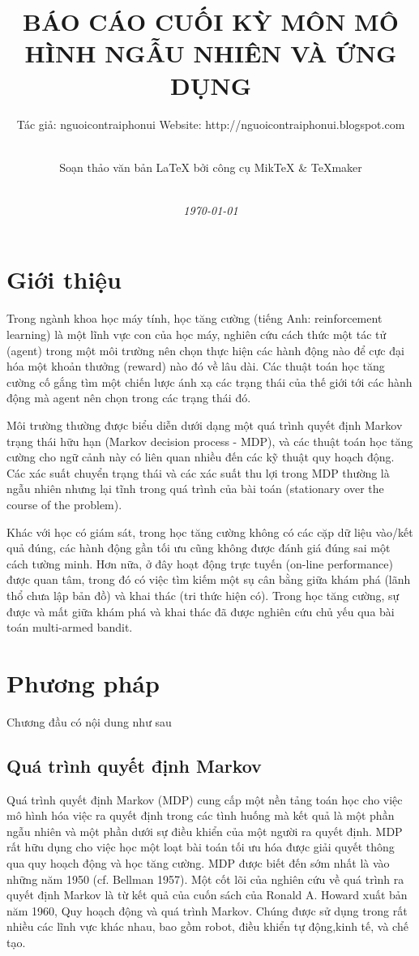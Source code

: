 \documentclass[14pt,a4paper,oneside]{report}		%
\title{{\bf  BÁO CÁO CUỐI KỲ MÔN MÔ HÌNH NGẪU NHIÊN VÀ ỨNG DỤNG}}
\author{Tác giả: nguoicontraiphonui \hspace*{1cm}Website: http://nguoicontraiphonui.blogspot.com \and \\
Soạn thảo văn bản \LaTeX{} bởi công cụ MikTeX $\&$ TeXmaker\\\\}
\date{{\em \today}}
\begin{document}
\pagestyle{fancy}	
\Large												%
\maketitle											%
\setlength{\baselineskip}{5truept}		%
\tableofcontents									%
\newpage
\setlength{\baselineskip}{18truept}	%
\chapter{Giới thiệu}
Trong ngành khoa học máy tính, học tăng cường (tiếng Anh: reinforcement learning) là một lĩnh vực con của học máy, nghiên cứu cách thức một tác tử (agent) trong một môi trường nên chọn thực hiện các hành động nào để cực đại hóa một khoản thưởng (reward) nào đó về lâu dài. Các thuật toán học tăng cường cố gắng tìm một chiến lược ánh xạ các trạng thái của thế giới tới các hành động mà agent nên chọn trong các trạng thái đó.

Môi trường thường được biểu diễn dưới dạng một quá trình quyết định Markov trạng thái hữu hạn (Markov decision process - MDP), và các thuật toán học tăng cường cho ngữ cảnh này có liên quan nhiều đến các kỹ thuật quy hoạch động. Các xác suất chuyển trạng thái và các xác suất thu lợi trong MDP thường là ngẫu nhiên nhưng lại tĩnh trong quá trình của bài toán (stationary over the course of the problem).

Khác với học có giám sát, trong học tăng cường không có các cặp dữ liệu vào/kết quả đúng, các hành động gần tối ưu cũng không được đánh giá đúng sai một cách tường minh. Hơn nữa, ở đây hoạt động trực tuyến (on-line performance) được quan tâm, trong đó có việc tìm kiếm một sụ cân bằng giữa khám phá (lãnh thổ chưa lập bản đồ) và khai thác (tri thức hiện có). Trong học tăng cường, sự được và mất giữa khám phá và khai thác đã được nghiên cứu chủ yếu qua bài toán multi-armed bandit.
\chapter{Phương pháp}
Chương đầu có nội dung như sau

\section{Quá trình quyết định Markov}
Quá trình quyết định Markov (MDP) cung cấp một nền tảng toán học cho việc mô hình hóa việc ra quyết định trong các tình huống mà kết quả là một phần ngẫu nhiên và một phần dưới sự điều khiển của một người ra quyết định. MDP rất hữu dụng cho việc học một loạt bài toán tối ưu hóa được giải quyết thông qua quy hoạch động và học tăng cường. MDP được biết đến sớm nhất là vào những năm 1950 (cf. Bellman 1957). Một cốt lõi của nghiên cứu về quá trình ra quyết định Markov là từ kết quả của cuốn sách của Ronald A. Howard xuất bản năm 1960, Quy hoạch động và quá trình Markov. Chúng được sử dụng trong rất nhiều các lĩnh vực khác nhau, bao gồm robot, điều khiển tự động,kinh tế, và chế tạo.
\end{document}
